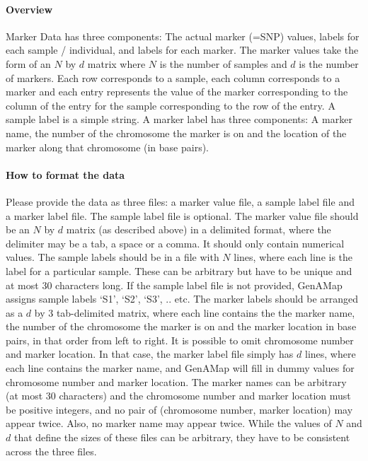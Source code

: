 \documentclass{article}
\begin{document}
\paragraph{Overview} Marker Data has three components: The actual marker (=SNP) values, labels for each sample / individual, and labels for each marker. The marker values take the form of an $N$ by $d$ matrix where $N$ is the number of samples and $d$ is the number of markers. Each row corresponds to a sample, each column corresponds to a marker and each entry represents the value of the marker corresponding to the column of the entry for the sample corresponding to the row of the entry. A sample label is a simple string. A marker label has three components: A marker name, the number of the chromosome the marker is on and the location of the marker along that chromosome (in base pairs).

\paragraph{How to format the data} Please provide the data as three files: a marker value file, a sample label file and a marker label file. The sample label file is optional. The marker value file should be an $N$ by $d$ matrix (as described above) in a delimited format, where the delimiter may be a tab, a space or a comma. It should only contain numerical values. The sample labels should be in a file with $N$ lines, where each line is the label for a particular sample. These can be arbitrary but have to be unique and at most 30 characters long. If the sample label file is not provided, GenAMap assigns sample labels `S1', `S2', `S3', .. etc. The marker labels should be arranged as a $d$ by 3 tab-delimited matrix, where each line contains the the marker name, the number of the chromosome the marker is on and the marker location in base pairs, in that order from left to right. It is possible to omit chromosome number and marker location. In that case, the marker label file simply has $d$ lines, where each line contains the marker name, and GenAMap will fill in dummy values for chromosome number and marker location. The marker names can be arbitrary (at most 30 characters) and the chromosome number and marker location must be positive integers, and no pair of (chromosome number, marker location) may appear twice. Also, no marker name may appear twice. While the values of $N$ and $d$ that define the sizes of these files can be arbitrary, they have to be consistent across the three files.\\
\end{document}
